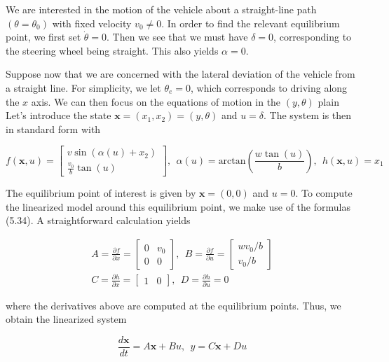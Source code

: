 We are interested in the motion of the vehicle about a straight-line path $(\theta = \theta_0 )$
with fixed velocity $v_0 \neq 0$. In order to find the relevant equilibrium point, 
we first set $\dot{\theta} = 0$. Then we see that we must have $\delta = 0$, corresponding to the steering wheel being
straight. This also yields $\alpha = 0$. 


Suppose now that we are concerned with the lateral deviation of the vehicle
from a straight line. For simplicity, we let $\theta_{e} = 0$, which corresponds to driving
along the $x$ axis. We can then focus on the equations of motion in the $(y, \theta)$ plain
Let's introduce  the state $\mathbf{x} = (x_1, x_2) = (y, \theta )$ and $u = \delta$. 
The system is then in standard form with

\begin{equation}
f(\mathbf{x}, u)=
\begin{bmatrix}
v\sin(\alpha(u) + x_2)  \\
 \frac{v_0}{b} \tan(u) 
\end{bmatrix}, ~~ \alpha(u) = \text{arctan}(\frac{w\tan(u)}{b}), ~~ h(\mathbf{x}, u) = x_1
\end{equation}

The  equilibrium  point  of  interest  is given  by $\mathbf{x} = (0, 0)$  and  $u = 0$.  
To compute  the linearized model around this equilibrium point, we make use of the formulas (5.34).
A straightforward calculation yields

\begin{eqnarray}
A = \frac{\partial f}{\partial x} =
 \begin{bmatrix}
   0 & v_0  \\
   0 & 0 
\end{bmatrix}, ~~
B = \frac{\partial f}{\partial u} =
 \begin{bmatrix}
   wv_0/b  \\
   v_0/b
\end{bmatrix} \\
C= \frac{\partial h}{\partial x} =
 \begin{bmatrix}
   1 & 0
\end{bmatrix}, ~~ D = \frac{\partial h}{\partial u} = 0
\end{eqnarray}

where the derivatives above are computed at the equilibrium points. Thus, we obtain the linearized system

\begin{equation}
\frac{d\mathbf{x}}{dt} = A\mathbf{x} + Bu, ~~ y=C\mathbf{x} + Du
\label{vehicle_steering_model_II}
\end{equation}

